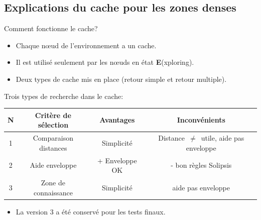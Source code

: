 \documentclass{beamer}
\begin{document}
  \subsection{Explications du cache pour les zones denses}
  \begin{frame}
	Comment fonctionne le cache?
	\begin{itemize}
 		\item Chaque nœud de l'environnement a un cache.
		\item Il est utilisé seulement par les nœuds en état \textbf{E}(xploring).
		\item Deux types de cache mis en place (retour simple et retour multiple).
	\end{itemize}
  \end{frame}

  \begin{frame}
	Trois types de recherche dans le cache:
	\vspace{3mm}
	\tiny{
	\begin{table}
  		\begin{center}
    		 \begin{tabular}{|c|c|c|c|}
      		 \hline
      		 N & Critère de sélection & Avantages & Inconvénients\\
      		 \hline
        	 1 & Comparaison distances & Simplicité & Distance~$\ne$~utile, aide pas enveloppe\\
        	 2 & Aide enveloppe & + Enveloppe OK & - bon règles Solipsis\\
        	 3 & Zone de connaissance & Simplicité & aide pas enveloppe\\
      		 \hline
    		 \end{tabular}
  		\end{center}
	\end{table}
	}
	\begin{itemize}
		\item La version 3 a été conservé pour les tests finaux.

	\end{itemize}
  \end{frame}
 
  \begin{frame}
  \end{frame}
	
\end{document}
